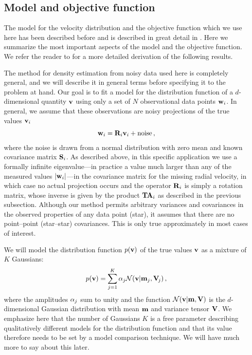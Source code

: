 \subsection{Model and objective function}

The model for the velocity distribution and the objective function
which we use here has been described before
\citep{2005ApJ...629..268H} and is described in great detail in
\citet{Bovy09a}. Here we summarize the most important aspects of the
model and the objective function. We refer the reader to
\citet{Bovy09a} for a more detailed derivation of the following
results.

The method for density estimation from noisy data used here is
completely general, and we will describe it in general terms before
specifying it to the problem at hand. Our goal is to fit a model for
the distribution function of a $d$-dimensional quantity $\boldsymbol{\mathbf{v}}$ using
only a set of $N$ observational data points $\mathbf{w}_i$. In general, we
assume that these observations are noisy projections of the true
values $\boldsymbol{\mathbf{v}}_i$
\begin{equation}
\mathbf{w}_i = \mathbf{R}_i \boldsymbol{\mathbf{v}}_i + \mbox{noise}\, ,
\end{equation}
where the noise is drawn from a normal distribution with zero mean and
known covariance matrix $\mathbf{S}_i$. As described above, in this specific
application we use a formally infinite eigenvalue---in practice a
value much larger than any of the measured values $|\mathbf{w}_i|$---in the
covariance matrix for the missing radial velocity, in which case no
actual projection occurs and the operator $\mathbf{R}_i$ is simply a rotation
matrix, whose inverse is given by the product $\mathbf{T}\mathbf{A}_i$ as described
in the previous subsection. Although our method permits arbitrary
variances and covariances in the observed properties of any data point
(star), it assumes that there are no point--point (star--star)
covariances. This is only true approximately in most cases of
interest.

We will model the distribution function $p(\boldsymbol{\mathbf{v}})$ of the true values
$\boldsymbol{\mathbf{v}}$ as a mixture of $K$ Gaussians:
\begin{equation}
p(\boldsymbol{\mathbf{v}}) = \sum_{j=1}^K \alpha_j \mathcal{N}(\boldsymbol{\mathbf{v}}|\mathbf{m}_j,\mathbf{V}_{\!j})\, ,
\end{equation}
where the amplitudes $\alpha_j$ sum to unity and the function
$\mathcal{N}(\boldsymbol{\mathbf{v}}|\mathbf{m},\mathbf{V})$ is the $d$-dimensional Gaussian distribution
with mean $\mathbf{m}$ and variance tensor $\mathbf{V}$. We emphasize here that the
number of Gaussians $K$ is a free parameter describing qualitatively
different models for the distribution function and that its value
therefore needs to be set by a model comparison technique. We will
have much more to say about this later.

